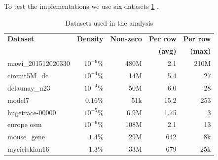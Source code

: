 \documentclass[conference]{IEEEtran}
\begin{document}
To test the implementations we use six datasets \ref{tab:dataset} .
\begin{table}[h!]
	\centering
	\begin{adjustbox}{width=0.9\columnwidth}
		\begin{tabular}{lrrrr}
			\toprule
			\textbf{Dataset} & \textbf{Density} & \textbf{Non-zero} & \textbf{Per row} & \textbf{Per row} \\
			&  \textbf{ } &  & \textbf{ (avg)} & \textbf{ (max)} \\
			\midrule
			mawi\_201512020330 & $10^{-6}\%$ & 480M & 2.1 & 210M \\
			circuit5M\_dc & $10^{-4}\%$ & 14M & 5.4 & 27 \\
			delaunay\_n23 & $10^{-4}\%$ & 50M & 6.0 & 28\\
			model7  & $0.16\%$ & 51k & 15.2 & 253\\
			hugetrace-00000 & $10^{-5}\%$ & 6.9M & 1.75 & 3\\
			europe osm & $10^{-6}\%$ & 108M & 2.1 & 13\\
			mouse\_gene & $1.4\%$ & 29M & 642 & 8k\\
			mycielskian16 & $1.3\%$ & 33M & 679 & 25k \\
			\bottomrule
		\end{tabular}
	\end{adjustbox}
	\vspace{1em}

	\caption{Datasets used in the analysis}
	\label{tab:dataset}
\end{table}
\end{document}
